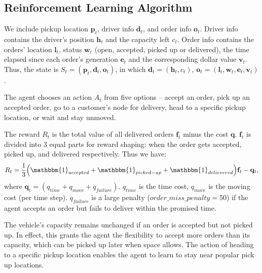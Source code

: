 \subsection{Reinforcement Learning Algorithm}
\label{subsec:vrp_rl}
\begin{description}[style=unboxed,leftmargin=0cm]
	\item[State:] 
	We include pickup location $\mathbf{p}_t$, driver info $\mathbf{d}_t$, and order info $\mathbf{o}_t$. Driver info contains the driver's position $\mathbf{h}_t$ and the capacity left $c_t$. Order info contains the orders' location $\mathbf{l}_t$, status $\mathbf{w}_t$ (open, accepted, picked up or delivered), the time elapsed since each order's generation $\mathbf{e}_t$ and the corresponding dollar value $\mathbf{v}_t$.  Thus, the state is  $S_t = (\mathbf{p}_t, \mathbf{d}_t, \mathbf{o}_t)$, in which $\mathbf{d}_t = (\mathbf{h}_t, c_t)$, $\mathbf{o}_t = (\mathbf{l}_t, \mathbf{w}_t, \mathbf{e}_t, \mathbf{v}_t)$.
	\item[Action] 
	The agent chooses an action $A_t$ from five options -- accept an order, pick up an accepted order, go to a customer's node for delivery, head to a specific pickup location, or wait and stay unmoved. 
	\item[Reward:] The reward $R_t$ is the total value of all delivered orders $\mathbf{f}_t$ minus the cost $\mathbf{q}$. $\mathbf{f}_t$ is divided into $3$ equal parts for reward shaping: when the order gets accepted, picked up, and delivered respectively. Thus we have:
	\begin{equation*}
			R_t = \frac{1}{3}\Big(\mathbbm{1}_{accepted} + \mathbbm{1}_{picked-up} + \mathbbm{1}_{delievered} \Big) \mathbf{f}_t - \mathbf{q}_t,
	\end{equation*}
	where $\mathbf{q}_t = (q_{time} + q_{move} + q_{failure})$. $q_{time}$ is the time cost, $q_{move}$ is the moving cost (per time step). $q_{failure}$ is a large penalty ($order\_miss\_penalty = 50$) if the agent accepts an order but fails to deliver within the promised time. 
	
\end{description}

The vehicle's capacity remains unchanged if an order is accepted but not picked up. In effect, this grants the agent the flexibility to accept more orders than its capacity, which can be picked up later when space allows. The action of heading to a specific pickup location enables the agent to learn to stay near popular pick up locations. %

